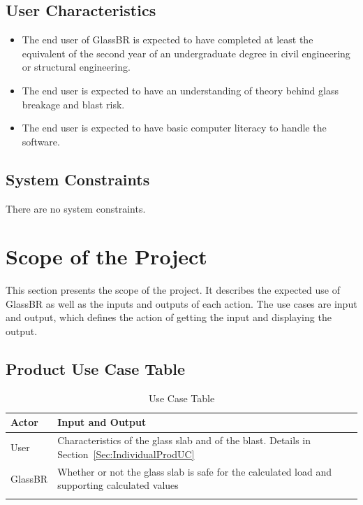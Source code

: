 \documentclass[12pt]{article}
\begin{document}
\subsection{User Characteristics}
\label{Sec:UserChars}
\begin{itemize}
\item{The end user of GlassBR is expected to have completed at least the equivalent of the second year of an undergraduate degree in civil engineering or structural engineering.}
\item{The end user is expected to have an understanding of theory behind glass breakage and blast risk.}
\item{The end user is expected to have basic computer literacy to handle the software.}
\end{itemize}
\subsection{System Constraints}
\label{Sec:SysConstraints}
There are no system constraints.
\section{Scope of the Project}
\label{Sec:ProjScope}
This section presents the scope of the project. It describes the expected use of GlassBR as well as the inputs and outputs of each action. The use cases are input and output, which defines the action of getting the input and displaying the output.
\subsection{Product Use Case Table}
\label{Sec:UseCaseTable}
\begin{longtabu}{l X[l]}
\toprule
Actor & Input and Output
\\
\midrule
User & Characteristics of the glass slab and of the blast. Details in Section~\ref{Sec:IndividualProdUC}
\\
GlassBR & Whether or not the glass slab is safe for the calculated load and supporting calculated values
\\
\bottomrule
\caption{Use Case Table}
\label{Table:useCaseTable}
\end{longtabu}
\end{document}
